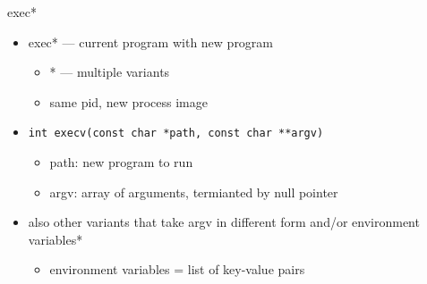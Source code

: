 \usetikzlibrary{matrix,patterns,arrows.meta,decorations.pathreplacing,shapes.misc,fit}

\begin{frame}{exec*}
\begin{itemize}
\item exec* ---  current program with new program
    \begin{itemize}
    \item * --- multiple variants
    \item same pid, new process image
    \end{itemize}
\item \texttt{int execv(const char *path, const char **argv)}
    \begin{itemize}
    \item path: new program to run
    \item argv: array of arguments, termianted by null pointer
    \end{itemize}
\item also other variants that take argv in different form and/or environment variables*
    \begin{itemize}
    \item \scriptsize *environment variables = list of key-value pairs
    \end{itemize}
\end{itemize}
\end{frame}

